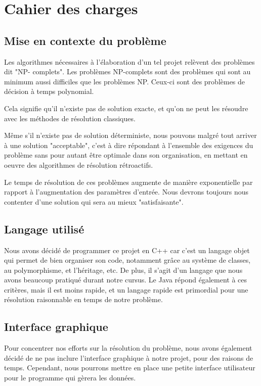\documentclass[12pt,a4paper,french]{article}
\begin{document}
\newpage
\section{Cahier des charges}
\subsection{Mise en contexte du problème}

Les algorithmes nécessaires à l'élaboration d'un tel projet relèvent des problèmes dit "NP- complets". Les problèmes NP-complets sont des problèmes qui sont au minimum aussi difficiles que les problèmes NP. Ceux-ci sont des problèmes de décision à temps polynomial.

Cela signifie qu'il n'existe pas de solution exacte, et qu'on ne peut les résoudre avec les méthodes de résolution classiques.

Même s'il n'existe pas de solution déterministe, nous pouvons malgré tout arriver à une solution "acceptable", c'est à dire répondant à l'ensemble des exigences du problème sans pour autant être optimale dans son organisation, en mettant en oeuvre des algorithmes de résolution rétroactifs.

Le temps de résolution de ces problèmes augmente de manière exponentielle par rapport à l'augmentation des paramètres d'entrée. Nous devrons toujours nous contenter d'une solution qui sera au mieux "satisfaisante".
\cite{01-npComplet}

\subsection{Langage utilisé}
Nous avons décidé de programmer ce projet en C++ car c'est un langage objet qui permet de bien organiser son code, notamment grâce au système de classes, au polymorphisme, et l'héritage, etc. De plus, il s'agit d'un langage que nous avons beaucoup pratiqué durant notre cursus.
Le Java répond également à ces critères, mais il est moins rapide, et un langage rapide est primordial pour une résolution raisonnable en temps de notre problème.

\subsection{Interface graphique}
Pour concentrer nos efforts sur la résolution du problème, nous avons également décidé de ne pas inclure l'interface graphique à notre projet, pour des raisons de temps. Cependant, nous pourrons mettre en place une petite interface utilisateur pour le programme qui gèrera les données.
\end{document}
